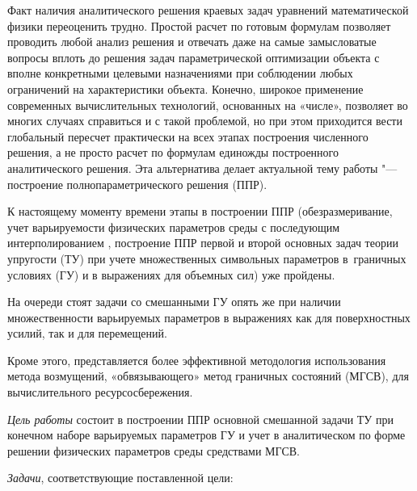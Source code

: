 
\makerutitle






Факт наличия аналитического решения краевых задач уравнений математической физики переоценить трудно. Простой расчет по готовым формулам позволяет проводить любой анализ решения и отвечать даже на самые замысловатые вопросы вплоть до решения задач параметрической оптимизации объекта с вполне конкретными целевыми назначениями при соблюдении любых ограничений на характеристики объекта. Конечно, широкое применение современных вычислительных технологий, основанных на «числе», позволяет во многих случаях справиться и с такой проблемой, но при этом приходится вести глобальный пересчет практически на всех этапах построения численного решения, а не просто расчет по формулам единожды построенного аналитического решения. Эта альтернатива делает актуальной тему работы "--- построение полнопараметрического решения (ППР).



К настоящему моменту времени этапы в построении ППР (обезразмеривание, учет варьируемости физических параметров среды с последующим интерполированием \cite{Novi_bib1}, построение ППР первой и второй основных задач теории упругости (ТУ) при учете множественных символьных параметров в~граничных условиях (ГУ) и в выражениях для объемных сил) уже пройдены. 

На очереди стоят задачи со смешанными ГУ опять же при наличии множественности варьируемых параметров в выражениях как  для поверхностных усилий, так и для перемещений. 

Кроме этого, представляется более эффективной методология использования метода возмущений, «обвязывающего» метод граничных состояний (МГСВ), для вычислительного ресурсосбережения.



\textit{Цель работы} состоит в построении ППР основной смешанной задачи ТУ при конечном наборе варьируемых параметров ГУ и учет в аналитическом по форме решении физических параметров среды средствами МГСВ.



\textit{Задачи}, соответствующие поставленной цели:

